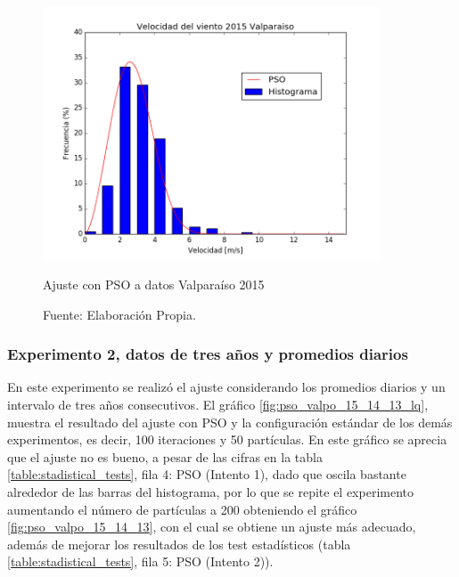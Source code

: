 \begin{figure}[H]
    \centering
    \includegraphics[height=75mm]{figures/result_2015.png}
    \caption{Ajuste con PSO a datos Valparaíso 2015}
    \vspace{-.25cm}
    \caption*{Fuente: Elaboración Propia.}
    \label{fig:pso_valpo_15}
\end{figure}

\subsubsection{Experimento 2, datos de tres años y promedios diarios}
En este experimento se realizó el ajuste considerando los promedios diarios y un intervalo de tres años consecutivos. El gráfico \ref{fig:pso_valpo_15_14_13_lq}, muestra el resultado del ajuste con PSO y la configuración estándar de los demás experimentos, es decir, 100 iteraciones y 50 partículas. En este gráfico se aprecia que el ajuste no es bueno, a pesar de las cifras en la tabla \ref{table:stadistical_tests}, fila 4: PSO (Intento 1), dado que oscila bastante alrededor de las barras del histograma, por lo que se repite el experimento aumentando el número de partículas a 200 obteniendo el gráfico \ref{fig:pso_valpo_15_14_13}, con el cual se obtiene un ajuste más adecuado, además de mejorar los resultados de los test estadísticos (tabla \ref{table:stadistical_tests}, fila 5: PSO (Intento 2)).\\


